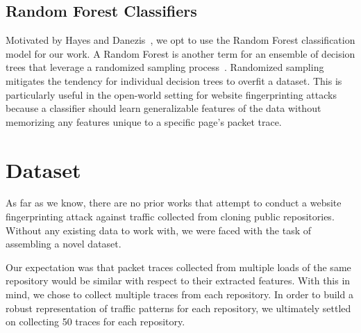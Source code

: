 \documentclass[sigconf,authorversion,nonacm]{acmart}
\begin{document}
\subsection{Random Forest Classifiers}
Motivated by Hayes and Danezis~\citep{hayes2016k}, we opt to use the Random Forest classification model for our work. A Random Forest is another term for an ensemble of decision trees that leverage a randomized sampling process~\citep{ho1995random}. Randomized sampling mitigates the tendency for individual decision trees to overfit a dataset. This is particularly useful in the open-world setting for website fingerprinting attacks because a classifier should learn generalizable features of the data without memorizing any features unique to a specific page's packet trace.

\section{Dataset}
As far as we know, there are no prior works that attempt to conduct a website fingerprinting attack against traffic collected from cloning public repositories. Without any existing data to work with, we were faced with the task of assembling a novel dataset.

Our expectation was that packet traces collected from multiple loads of the same repository would be similar with respect to their extracted features. With this in mind, we chose to collect multiple traces from each repository. In order to build a robust representation of traffic patterns for each repository, we ultimately settled on collecting 50 traces for each repository.
\end{document}
